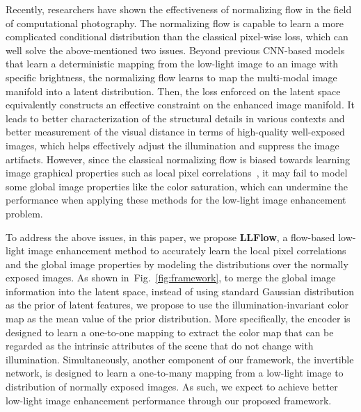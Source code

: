 \documentclass[letterpaper]{article} \usepackage{aaai22}  \usepackage{times}  \usepackage{helvet}  \usepackage{courier}  \usepackage[hyphens]{url}  \usepackage{graphicx} \urlstyle{rm} \def\UrlFont{\rm}  \usepackage{natbib}  \usepackage{caption} \usepackage{subfigure}
\newcommand{\Fref}[1]{Fig.~\ref{#1}}
\newcommand{\yufei}[1]{{#1}}
\begin{document}
 
\yufei{Recently, researchers have shown the effectiveness of normalizing flow in the field of computational photography. \cite{wolf2021deflow, lugmayr2020srflow, xiao2020invertible}}
The normalizing flow is capable to learn a more complicated conditional distribution than the classical pixel-wise loss, which can well solve the above-mentioned two issues.
Beyond previous CNN-based models that learn a deterministic mapping from the low-light image to an image with specific brightness,
the normalizing flow learns to map the multi-modal image manifold into a latent distribution.
Then, the loss enforced on the latent space equivalently constructs an effective constraint on the enhanced image manifold.
It leads to better characterization of the structural details in various contexts and better measurement of the visual distance in terms of high-quality well-exposed images, which helps effectively adjust the illumination and suppress the image artifacts.
However, since the classical normalizing flow is biased towards learning image graphical properties such as local pixel correlations~\cite{kirichenko2020normalizing}, it may fail to model some global image properties like the color saturation, which can undermine the performance when applying these methods for the low-light image enhancement problem.




To address the above issues, in this paper, we propose \textbf{LLFlow}, a flow-based low-light image enhancement method to accurately learn the local pixel correlations and the global image properties by modeling the distributions over the normally exposed images.
As shown in~\Fref{fig:framework}, to merge the global image information into the latent space, instead of using standard Gaussian distribution as the prior of latent features, we propose to use the illumination-invariant color map as the mean value of the prior distribution.
More specifically, the encoder is designed to learn a one-to-one mapping to extract the color map that can be regarded as the intrinsic attributes of the scene that do not change with illumination. 
Simultaneously, another component of our framework, the invertible network, is designed to learn a one-to-many mapping from a low-light image to distribution of normally exposed images. As such, we expect to achieve better low-light image enhancement performance through our proposed framework. 
\end{document}
